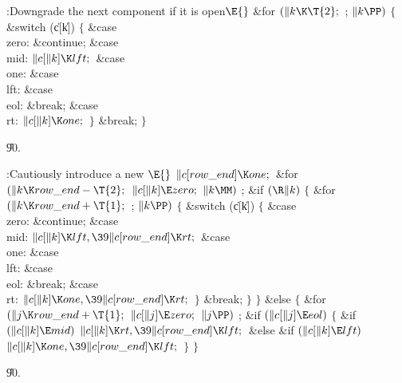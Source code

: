 \B{}:Downgrade the next component if it is open\X${}%
\E{}$\6
\&{for} ${}(\|k\K\T{2};{}$  ; ${}\|k\PP){}$\5
${}\{{}$\1\6
\&{switch} (\|c[\|k])\5
${}\{{}$\1\6
\4\&{case} \\{zero}:\5
\&{continue};\6
\4\&{case} \\{mid}:\5
${}\|c[\|k]\K\\{lft};{}$\6
\4\&{case} \\{one}:\5
\&{case} \\{lft}:\5
\&{case} \\{eol}:\5
\&{break};\6
\4\&{case} \\{rt}:\5
${}\|c[\|k]\K\\{one};{}$\6
\4${}\}{}$\2\6
\&{break};\6
\4${}\}{}$\2\par
\U90.\fi

\B{}:Cautiously introduce a new \X${}\E{}$\6
$\|c[\\{row\_end}]\K\\{one};{}$\6
\&{for} ${}(\|k\K\\{row\_end}-\T{2};{}$ ${}\|c[\|k]\E\\{zero};{}$ ${}\|k\MM){}$%
\1\5
;\2\6
\&{if} ${}(\R\|k){}$\5
${}\{{}$\1\6
\&{for} ${}(\|k\K\\{row\_end}+\T{1};{}$  ; ${}\|k\PP){}$\5
${}\{{}$\1\6
\&{switch} (\|c[\|k])\5
${}\{{}$\1\6
\4\&{case} \\{zero}:\5
\&{continue};\6
\4\&{case} \\{mid}:\5
${}\|c[\|k]\K\\{lft},\39\|c[\\{row\_end}]\K\\{rt};{}$\6
\4\&{case} \\{one}:\5
\&{case} \\{lft}:\5
\&{case} \\{eol}:\5
\&{break};\6
\4\&{case} \\{rt}:\5
${}\|c[\|k]\K\\{one},\39\|c[\\{row\_end}]\K\\{rt};{}$\6
\4${}\}{}$\2\6
\&{break};\6
\4${}\}{}$\2\6
\4${}\}{}$\5
\2\&{else}\5
${}\{{}$\1\6
\&{for} ${}(\|j\K\\{row\_end}+\T{1};{}$ ${}\|c[\|j]\E\\{zero};{}$ ${}\|j\PP){}$%
\1\5
;\2\6
\&{if} ${}(\|c[\|j]\E\\{eol}){}$\5
${}\{{}$\1\6
\&{if} ${}(\|c[\|k]\E\\{mid}){}$\1\5
${}\|c[\|k]\K\\{rt},\39\|c[\\{row\_end}]\K\\{lft};{}$\2\6
\&{else} \&{if} ${}(\|c[\|k]\E\\{lft}){}$\1\5
${}\|c[\|k]\K\\{one},\39\|c[\\{row\_end}]\K\\{lft};{}$\2\6
\4${}\}{}$\2\6
\4${}\}{}$\2\par
\U90.\fi

